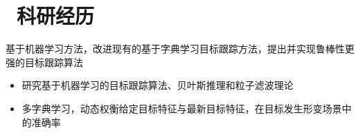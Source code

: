 \documentclass{resume}
\begin{document}



\section{\faUsers\ 科研经历}

\begin{onehalfspacing}
基于机器学习方法，改进现有的基于字典学习目标跟踪方法，提出并实现鲁棒性更强的目标跟踪算法
\begin{itemize}
  \item 研究基于机器学习的目标跟踪算法、贝叶斯推理和粒子滤波理论
  \item 多字典学习，动态权衡给定目标特征与最新目标特征，在目标发生形变场景中的准确率
\end{itemize}
\end{onehalfspacing}
\end{document}
